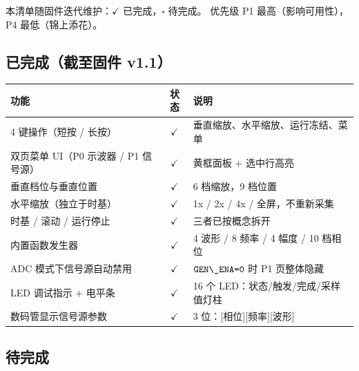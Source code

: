 \documentclass[UTF8,a4paper,11pt]{ctexart}
\begin{document}
本清单随固件迭代维护：$\checkmark$ 已完成，$\square$ 待完成。
优先级 P1 最高（影响可用性），P4 最低（锦上添花）。

\subsection*{已完成（截至固件 v1.1）}

\begin{center}
\small
\begin{tabular}{p{6.2cm}cp{6.0cm}}
\toprule
功能 & 状态 & 说明\\
\midrule
4 键操作（短按 / 长按） & $\checkmark$ & 垂直缩放、水平缩放、运行冻结、菜单\\
双页菜单 UI（P0 示波器 / P1 信号源） & $\checkmark$ & 黄框面板 + 选中行高亮\\
垂直档位与垂直位置 & $\checkmark$ & 6 档缩放，9 档位置\\
水平缩放（独立于时基） & $\checkmark$ & 1x / 2x / 4x / 全屏，不重新采集\\
时基 / 滚动 / 运行停止 & $\checkmark$ & 三者已按概念拆开\\
内置函数发生器 & $\checkmark$ & 4 波形 / 8 频率 / 4 幅度 / 10 档相位\\
ADC 模式下信号源自动禁用 & $\checkmark$ & \(\sig{GEN\_ENA=0}\) 时 P1 页整体隐藏\\
LED 调试指示 + 电平条 & $\checkmark$ & 16 个 LED：状态/触发/完成/采样值灯柱\\
数码管显示信号源参数 & $\checkmark$ & 3 位：[相位][频率][波形]\\
\bottomrule
\end{tabular}
\end{center}

\subsection*{待完成}
\end{document}
